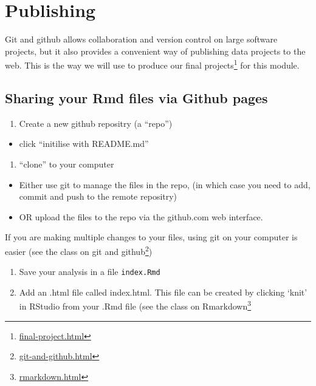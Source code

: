 \documentclass[
  12pt,
  a5paper,
]{book}
\DeclareRobustCommand{\href}[2]{#2\footnote{\url{#1}}}
\providecommand{\tightlist}{%
  \setlength{\itemsep}{0pt}\setlength{\parskip}{0pt}}
\begin{document}
\hypertarget{publishing}{%
\chapter{Publishing}\label{publishing}}

Git and github allows collaboration and version control on large software projects, but it also provides a convenient way of publishing data projects to the web. This is the way we will use to produce our \href{final-project.html}{final projects} for this module.

\hypertarget{sharing-your-rmd-files-via-github-pages}{%
\section{Sharing your Rmd files via Github pages}\label{sharing-your-rmd-files-via-github-pages}}

\begin{enumerate}
\def\labelenumi{\arabic{enumi}.}
\tightlist
\item
  Create a new github repositry (a ``repo'')
\end{enumerate}

\begin{itemize}
\tightlist
\item
  click ``initilise with README.md''
\end{itemize}

\begin{enumerate}
\def\labelenumi{\arabic{enumi}.}
\setcounter{enumi}{1}
\tightlist
\item
  ``clone'' to your computer
\end{enumerate}

\begin{itemize}
\tightlist
\item
  Either use git to manage the files in the repo, (in which case you need to add, commit and push to the remote repositry)
\item
  OR upload the files to the repo via the github.com web interface.
\end{itemize}

If you are making multiple changes to your files, using git on your computer is easier (see the class on \href{git-and-github.html}{git and github})

\begin{enumerate}
\def\labelenumi{\arabic{enumi}.}
\setcounter{enumi}{2}
\item
  Save your analysis in a file \texttt{index.Rmd}
\item
  Add an .html file called index.html. This file can be created by clicking `knit' in RStudio from your .Rmd file (see the class on \href{rmarkdown.html}{Rmarkdown}
\end{enumerate}
\end{document}
